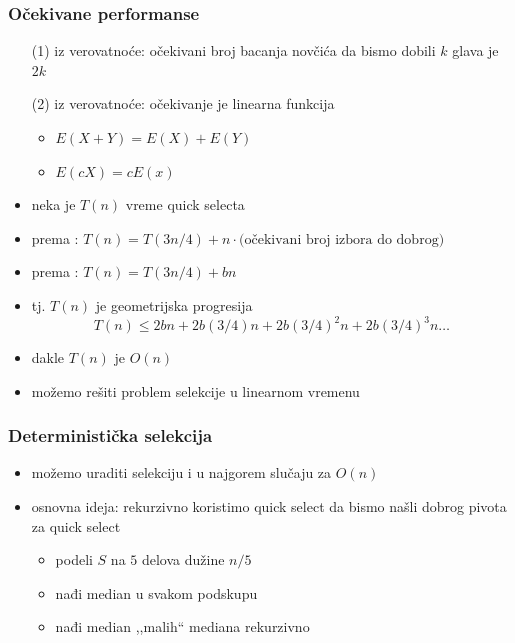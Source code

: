 \documentclass[compress,aspectratio=169]{beamer}
\begin{document}
\begin{frame}[fragile]
  \frametitle{Očekivane performanse}
  \begin{itemize}
    \item[(1)] iz verovatnoće: očekivani broj bacanja novčića da bismo dobili $k$ glava je $2k$
    \item[(2)] iz verovatnoće: očekivanje je linearna funkcija
    \begin{itemize}
      \item $E(X+Y) = E(X)+E(Y)$
      \item $E(cX) = cE(x)$
    \end{itemize}
    \item neka je $T(n)$ vreme quick selecta
    \item prema : $T(n) = T(3n/4) + n\cdot\text{(očekivani broj izbora do dobrog)}$
    \item prema : $T(n) = T(3n/4) + bn$
    \item tj. $T(n)$ je geometrijska progresija
    $$T(n) \leq 2bn + 2b(3/4)n + 2b(3/4)^2n + 2b(3/4)^3n \ldots $$
    \item dakle $T(n)$ je $O(n)$
    \item možemo rešiti problem selekcije u linearnom vremenu
  \end{itemize}
\end{frame}

\begin{frame}[fragile]
  \frametitle{Deterministička selekcija}
  \begin{itemize}
    \item možemo uraditi selekciju i u najgorem slučaju za $O(n)$
    \item osnovna ideja: rekurzivno koristimo quick select da bismo našli dobrog pivota za quick select
    \begin{itemize}
      \item podeli $S$ na $5$ delova dužine $n/5$
      \item nađi median u svakom podskupu
      \item nađi median ,,malih`` mediana rekurzivno
    \end{itemize}
  \end{itemize}
\end{frame}
\end{document}
